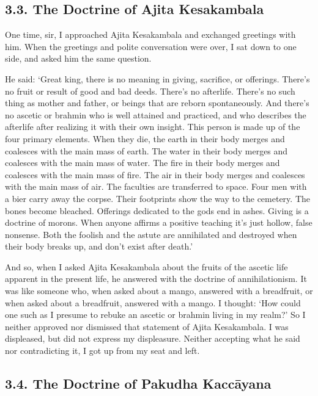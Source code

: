 \documentclass[12pt,openany]{book}%
\begin{document}
\subsection*{3.3. The Doctrine of Ajita Kesakambala }

One time, sir, I approached Ajita Kesakambala and exchanged greetings with him. When the greetings and polite conversation were over, I sat down to one side, and asked him the same question. 

He said: ‘Great king, there is no meaning in giving, sacrifice, or offerings. There’s no fruit or result of good and bad deeds. There’s no afterlife. There’s no such thing as mother and father, or beings that are reborn spontaneously. And there’s no ascetic or brahmin who is well attained and practiced, and who describes the afterlife after realizing it with their own insight. This person is made up of the four primary elements. When they die, the earth in their body merges and coalesces with the main mass of earth. The water in their body merges and coalesces with the main mass of water. The fire in their body merges and coalesces with the main mass of fire. The air in their body merges and coalesces with the main mass of air. The faculties are transferred to space. Four men with a bier carry away the corpse. Their footprints show the way to the cemetery. The bones become bleached. Offerings dedicated to the gods end in ashes. Giving is a doctrine of morons. When anyone affirms a positive teaching it’s just hollow, false nonsense. Both the foolish and the astute are annihilated and destroyed when their body breaks up, and don’t exist after death.’ 

And so, when I asked Ajita Kesakambala about the fruits of the ascetic life apparent in the present life, he answered with the doctrine of annihilationism. It was like someone who, when asked about a mango, answered with a breadfruit, or when asked about a breadfruit, answered with a mango. I thought: ‘How could one such as I presume to rebuke an ascetic or brahmin living in my realm?’ So I neither approved nor dismissed that statement of Ajita Kesakambala. I was displeased, but did not express my displeasure. Neither accepting what he said nor contradicting it, I got up from my seat and left. 

\subsection*{3.4. The Doctrine of Pakudha \textsanskrit{Kaccāyana} }
\end{document}
